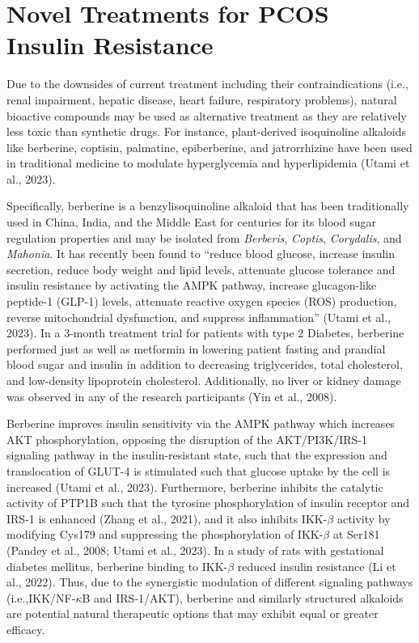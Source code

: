\section{Novel Treatments for PCOS Insulin Resistance}

Due to the downsides of current treatment including their contraindications (i.e., renal impairment, hepatic disease, heart failure, respiratory problems), natural bioactive compounds may be used as alternative treatment as they are relatively less toxic than synthetic drugs. For instance, plant-derived isoquinoline alkaloids like berberine, coptisin, palmatine, epiberberine, and jatrorrhizine have been used in traditional medicine to modulate hyperglycemia and hyperlipidemia (Utami et al., 2023). 

Specifically, berberine is a benzylisoquinoline alkaloid that has been traditionally used in China, India, and the Middle East for centuries for its blood sugar regulation properties and may be isolated from \textit{Berberis}, \textit{Coptis}, \textit{Corydalis}, and \textit{Mahonia}. It has recently been found to “reduce blood glucose, increase insulin secretion, reduce body weight and lipid levels, attenuate glucose tolerance and insulin resistance by activating the AMPK pathway, increase glucagon-like peptide-1 (GLP-1) levels, attenuate reactive oxygen species (ROS) production, reverse mitochondrial dysfunction, and suppress inflammation” (Utami et al., 2023). In a 3-month treatment trial for patients with type 2 Diabetes, berberine performed just as well as metformin in lowering patient fasting and prandial blood sugar and insulin in addition to decreasing triglycerides, total cholesterol, and low-density lipoprotein cholesterol. Additionally, no liver or kidney damage was observed in any of the research participants (Yin et al., 2008).

Berberine improves insulin sensitivity via the AMPK pathway which increases AKT phosphorylation, opposing the disruption of the AKT/PI3K/IRS-1 signaling pathway in the insulin-resistant state, such that the expression and translocation of GLUT-4 is stimulated such that glucose uptake by the cell is increased (Utami et al., 2023). Furthermore, berberine inhibits the catalytic activity of PTP1B such that the tyrosine phosphorylation of insulin receptor and IRS-1 is enhanced (Zhang et al., 2021), and it also inhibits IKK-$\beta$ activity by modifying Cys179 and suppressing the phosphorylation of IKK-$\beta$ at Ser181 (Pandey et al., 2008; Utami et al., 2023). In a study of rats with gestational diabetes mellitus, berberine binding to IKK-$\beta$ reduced insulin resistance (Li et al., 2022). Thus, due to the synergistic modulation of different signaling pathways (i.e.,IKK/NF-$\kappa$B and IRS-1/AKT), berberine and similarly structured alkaloids are potential natural therapeutic options that may exhibit equal or greater efficacy.

